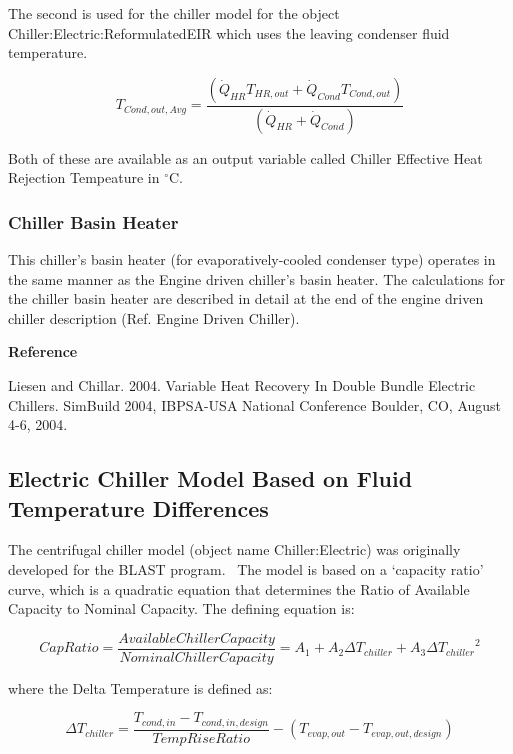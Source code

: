 The second is used for the chiller model for the object Chiller:Electric:ReformulatedEIR which uses the leaving condenser fluid temperature.

\begin{equation}
{T_{Cond,out,Avg}} = \frac{{\left( {{{\dot Q}_{HR}}{T_{HR,out}} + {{\dot Q}_{Cond}}{T_{Cond,out}}} \right)}}{{\left( {{{\dot Q}_{HR}} + {{\dot Q}_{Cond}}} \right)}}
\end{equation}

Both of these are available as an output variable called Chiller Effective Heat Rejection Tempeature in \(^{\circ}\)C.

\subsubsection{Chiller Basin Heater}\label{chiller-basin-heater-2}

This chiller's basin heater (for evaporatively-cooled condenser type) operates in the same manner as the Engine driven chiller's basin heater. The calculations for the chiller basin heater are described in detail at the end of the engine driven chiller description (Ref. Engine Driven Chiller).

\textbf{Reference}

Liesen and Chillar. 2004. Variable Heat Recovery In Double Bundle Electric Chillers. SimBuild 2004, IBPSA-USA National Conference Boulder, CO, August 4-6, 2004.

\subsection{Electric Chiller Model Based on Fluid Temperature Differences}\label{electric-chiller-model-based-on-fluid-temperature-differences}

The centrifugal chiller model (object name Chiller:Electric) was originally developed for the BLAST program.~ The model is based on a `capacity ratio' curve, which is a quadratic equation that determines the Ratio of Available Capacity to Nominal Capacity. The defining equation is:

\begin{equation}
CapRatio = \frac{{Available Chiller Capacity}}{{Nominal Chiller Capacity}} = {A_1} + {A_2}\Delta {T_{chiller}} + {A_3}\Delta {T_{chiller}}^2
\end{equation}

where the Delta Temperature is defined as:

\begin{equation}
\Delta {T_{chiller}} = \frac{{{T_{cond, in}} - {T_{cond,in,design}}}}{{TempRiseRatio}} - \left( {{T_{evap,out}} - {T_{evap,out,design}}} \right)
\end{equation}

